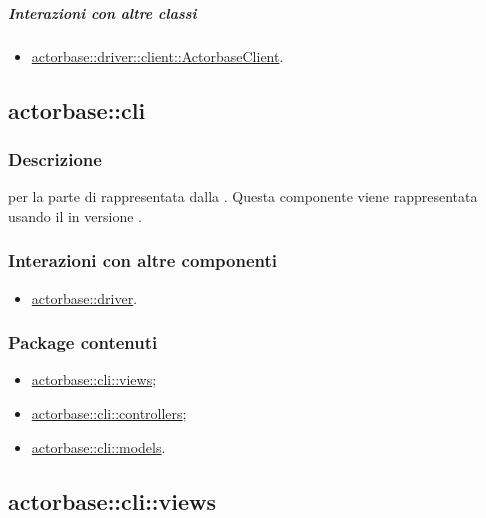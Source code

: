 \documentclass{scalatekids-article}
\begin{document}
\subparagraph{Interazioni con altre classi}

\begin{itemize}
	\item \hyperref[sec:actorbase::driver::client::ActorbaseClient]{actorbase::driver::client::ActorbaseClient}.
\end{itemize}


\subsection{actorbase::cli}
\label{sec:actorbase::cli}

\subsubsection{Descrizione}

 per la parte di  rappresentata dalla .
Questa componente viene rappresentata usando il 
 in versione .

\subsubsection{Interazioni con altre componenti}

\begin{itemize}
\item \hyperref[sec:actorbase::driver]{actorbase::driver}.
\end{itemize}

\subsubsection{Package contenuti}

\begin{itemize}
\item \hyperref[sec:actorbase::cli::views]{actorbase::cli::views};
\item \hyperref[sec:actorbase::cli::controllers]{actorbase::cli::controllers};
\item \hyperref[sec:actorbase::cli::models]{actorbase::cli::models}.
\end{itemize}

\subsection{actorbase::cli::views}
\label{sec:actorbase::cli::views}
\end{document}
